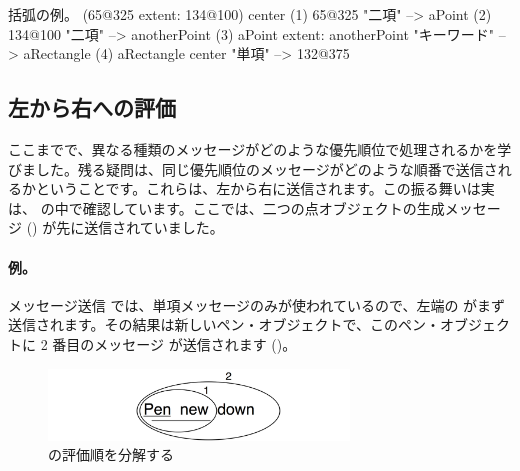 \documentclass[a4paper,10pt,twoside]{book}
\begin{document}
\begin{example}[decExtent]{括弧の例。}{}
      (65@325 extent: 134@100) center
(1)   65@325                                                    "二項"
    --> aPoint
(2)                                134@100                     "二項"
                                 --> anotherPoint
(3)   aPoint extent: anotherPoint                       "キーワード"
      --> aRectangle
(4)   aRectangle center                                     "単項"
      --> 132@375
\end{example}

\subsection{左から右への評価}
ここまでで、異なる種類のメッセージがどのような優先順位で処理されるかを学びました。残る疑問は、同じ優先順位のメッセージがどのような順番で送信されるかということです。これらは、左から右に送信されます。この振る舞いは実は、 の中で確認しています。ここでは、二つの点オブジェクトの生成メッセージ () が先に送信されていました。



\paragraph{例。} メッセージ送信  では、単項メッセージのみが使われているので、左端の  がまず送信されます。その結果は新しいペン・オブジェクトで、このペン・オブジェクトに 2 番目のメッセージ  が送信されます ()。

\begin{figure}
	\centering
	\includegraphics[width=8cm]{ucompoUn}
	\caption{の評価順を分解する}
\end{figure}
\end{document}
